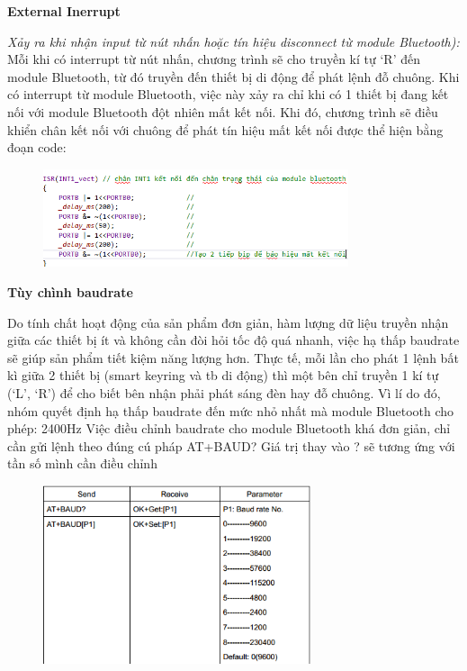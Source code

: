 \textbf{External Inerrupt}

\textit{Xảy ra khi nhận input từ nút nhấn hoặc tín hiệu disconnect từ module Bluetooth):}
Mỗi khi có interrupt từ nút nhấn, chương trình sẽ cho truyền kí tự ‘R’ đến module Bluetooth, từ đó truyền đến thiết bị di động để phát lệnh đỗ chuông.
Khi có interrupt từ module Bluetooth, việc này xảy ra chỉ khi có 1 thiết bị đang kết nối với module Bluetooth đột nhiên mất kết nối. Khi đó, chương trình sẽ điều khiển chân kết nối với chuông để phát tín hiệu mất kết nối được thể hiện bằng đoạn code:

	\begin{figure}[H]
		\centering    
		\includegraphics[width=0.8\textwidth]{int2}
		\label{fig: int2}
	\end{figure}

\textbf{Tùy chình baudrate}

Do tính chất hoạt động của sản phẩm đơn giản, hàm lượng dữ liệu truyền nhận giữa các thiết bị ít và không cần đòi hỏi tốc độ quá nhanh, việc hạ thấp baudrate sẽ giúp sản phẩm tiết kiệm năng lượng hơn. Thực tế, mỗi lần cho phát 1 lệnh bất kì giữa 2 thiết bị (smart keyring và tb di động) thì một bên chỉ truyền 1 kí tự (‘L’, ‘R’) để cho biết bên nhận phải phát sáng đèn hay  đỗ chuông. Vì lí do đó, nhóm quyết định hạ thấp baudrate đến mức nhỏ nhất mà module Bluetooth cho phép: 2400Hz
Việc điều chỉnh baudrate cho module Bluetooth khá đơn giản, chỉ cần gửi lệnh theo đúng cú pháp AT+BAUD?
Giá trị thay vào ? sẽ tương ứng với tần số mình cần điều chỉnh

	\begin{figure}[H]
		\centering    
		\includegraphics[width=0.7\textwidth]{baud}
		\label{fig: baud}
	\end{figure}

